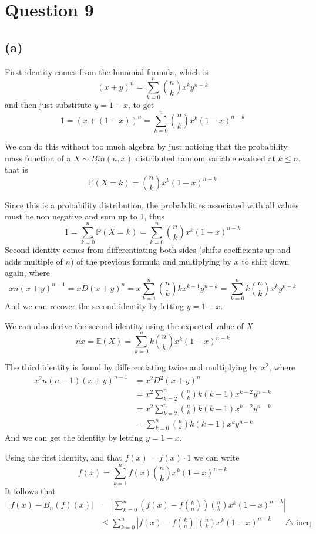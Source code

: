 \documentclass[12pt]{article}
\begin{document}
\section*{Question 9}
\subsection*{(a)} 

First identity comes from the binomial formula, which is 
$$(x+y)^n = \sum_{k=0}^n \binom{n}{k} x^k y^{n-k}$$
and then just substitute $y = 1-x$, to get 
$$1 = (x+(1-x))^n  = \sum_{k=0}^n \binom{n}{k} x^k (1-x)^{n-k}$$



We can do this without too much algebra by just noticing that the probability mass function of a $X \sim Bin(n,x)$ distributed random variable evalued at $k \leq n$, that is  
$$
	\mathbb{P}(X = k) = \binom{n}{k} x^k (1-x)^{n-k}
$$

Since this is a probability distribution, the probabilities associated with all values must be non negative and sum up to 1, thus
$$
1 = \sum_{k=0}^n \mathbb{P}(X=k) = \sum_{k=0}^n \binom{n}{k} x^k (1-x)^{n-k} 
$$
Second identity comes from differentiating both sides (shifts coefficients up and adds multiple of $n$) of the previous formula and multiplying by $x$ to shift down again,
where
$$  xn(x+y)^{n-1}= x D(x+y)^n  =  x\sum_{k=1}^n \binom{n}{k} k x^{k-1}y^{n-k} =\sum_{k=0}^n k \binom{n}{k}x^k y^{n-k}  $$
And we can recover the second identity by letting $y =1-x$. 

We can also derive the second identity using the expected value of $X$
$$nx = \mathbb{E}(X) = \sum_{k=0}^n k \binom{n}{k}x^k (1-x)^{n-k} $$

The third identity is found by differentiating twice and multiplying by $x^2$, where
\begin{align*}	
 x^2n(n-1) (x+y)^{n-1} &= x^2 D^2 (x+y)^n \\
 &= x^2 \sum_{k=2}^n \binom{n}{k} k (k-1) x^{k-2}y^{n-k}\\
 &= x^2 \sum_{k=2}^n \binom{n}{k} k (k-1) x^{k-2}y^{n-k} \\
 &= \sum_{k=0}^n \binom{n}{k}k(k-1)x^k y^{n-k}
 \end{align*}
 And we can get the identity by letting $y = 1-x$. 
 
Using the first identity, and that $f(x) = f(x) \cdot 1$ we can write
$$f(x) = \sum_{k=1}^n f(x) \binom{n}{k} x^k (1-x)^{n-k}$$
It follows that 
\begin{align*}
\left|f(x) - B_n(f)(x)\right | &= \left | \sum_{k=0}^n \left(f(x) - f\left(\frac{k}{n} \right) \right) \binom{n}{k}x^{k}(1-x)^{n-k}\right| \\
	&\leq \sum_{k=0}^n \left|f(x) - f\left ( \frac{k}{n}\right)\right|\binom{n}{k} x^k (1-x)^{n-k} \quad \text{ $\triangle$-ineq}
\end{align*}
\end{document}
